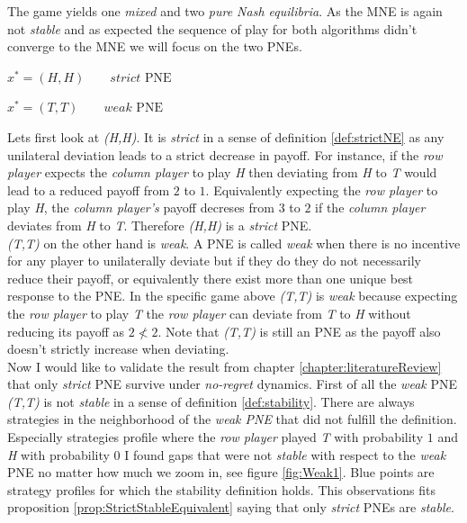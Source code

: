 The game yields one \textit{mixed} and two \textit{pure Nash equilibria}. As the MNE is again not \textit{stable} and as expected the sequence of play for both algorithms didn't converge to the MNE we will focus on the two PNEs. 

\begin{description}\centering
    \item $x^{*} = (H,H) \qquad \textit{strict }\text{PNE}$
    \item $x^{*} = (T,T) \qquad \textit{weak }\text{PNE}$
\end{description}

Lets first look at \textit{(H,H)}. It is \textit{strict} in a sense of definition \ref{def:strictNE} as any unilateral deviation leads to a strict decrease in payoff. For instance, if the \textit{row player} expects the \textit{column player} to play \textit{H} then deviating from \textit{H} to \textit{T} would lead to a reduced payoff from $2$ to $1$. Equivalently expecting the \textit{row player} to play \textit{H}, the \textit{column player's} payoff decreses from $3$ to $2$ if the \textit{column player} deviates from \textit{H} to \textit{T}. Therefore \textit{(H,H)} is a \textit{strict} PNE. \\

\textit{(T,T)} on the other hand is \textit{weak}. A PNE is called \textit{weak} when there is no incentive for any player to unilaterally deviate but if they do they do not necessarily reduce their payoff, or equivalently there exist more than one unique best response to the PNE. In the specific game above \textit{(T,T)} is \textit{weak} because expecting the \textit{row player} to play \textit{T} the \textit{row player} can deviate from \textit{T} to \textit{H} without reducing its payoff as $2 \nless 2$. Note that \textit{(T,T)} is still an PNE as the payoff also doesn't strictly increase when deviating. \\

Now I would like to validate the result from chapter \ref{chapter:literatureReview} that only \textit{strict} PNE survive under \textit{no-regret} dynamics. First of all the \textit{weak} PNE \textit{(T,T)} is not \textit{stable} in a sense of definition \ref{def:stability}. There are always strategies in the neighborhood of the \textit{weak PNE} that did not fulfill the definition. Especially strategies profile where the \textit{row player} played \textit{T} with probability $1$ and \textit{H} with probability $0$ I found gaps that were not \textit{stable} with respect to the \textit{weak} PNE no matter how much we zoom in, see figure \ref{fig:Weak1}. Blue points are strategy profiles for which the stability definition holds. This observations fits proposition \ref{prop:StrictStableEquivalent} saying that only \textit{strict} PNEs are \textit{stable}.

